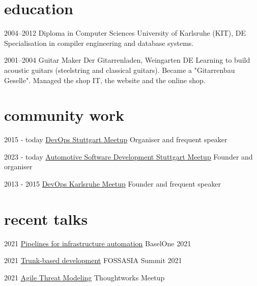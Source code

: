 \documentclass[]{friggeri-cv} %
\begin{document}
\section{\color{red}education}

\begin{entrylist}

\entry
{2004--2012}
{Diploma in Computer Sciences}
{University of Karlsruhe (KIT), DE}
{Specialisation in compiler engineering and database systems.
}

\entry
{2001--2004}
{Guitar Maker}
{Der Gitarrenladen, Weingarten DE}
{Learning to build acoustic guitars (steelstring and classical guitars). Became a "Gitarrenbau Geselle". Managed the shop IT, the website and the online shop.
}
\end{entrylist}


\section{\color{red}community work}

\begin{entrylist}
  \entry
  {2015 - today}
  {\href{https://www.meetup.com/de-DE/devops-stuttgart/}{DevOps Stuttgart Meetup}}
  {Organiser and frequent speaker}


  \entry
  {2023 - today}
  {\href{https://www.meetup.com/de-DE/automotive-software-development/}{Automotive Software Development Stuttgart Meetup}}
  {Founder and organiser}

  \entry
  {2013 - 2015}
  {\href{https://www.meetup.com/de-DE/devops-karlsruhe/}{DevOps Karlsruhe Meetup}}
  {Founder and frequent speaker}

\end{entrylist}

\section{\color{red}recent talks}

\begin{entrylist}
  \entry
  {2021}
  {\href{https://2021.baselone.ch/speech.html?id=A0482ED6-27CD-4C1A-8305-6C2492B54A8D}{Pipelines for infrastructure automation}}
  {BaselOne 2021}


  \entry
  {2021}
  {\href{https://eventyay.com/e/fa96ae2c/session/6763}{Trunk-based development}}
  {FOSSASIA Summit 2021}

  \entry
  {2021}
  {\href{https://youtu.be/8Rf_x6GNNiM}{Agile Threat Modeling}}
  {Thoughtworks Meetup}

\end{entrylist}
\end{document}
